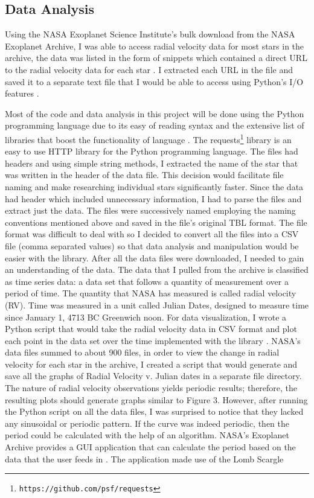 \documentclass[12pt]{article}
\begin{document}
\subsection{Data Analysis}
Using the NASA Exoplanet Science Institute’s bulk download from the NASA Exoplanet Archive, I was able to access radial velocity data for most stars in the archive,  the data was listed in the form of {
\selectfont{wget}} snippets which contained a direct URL to the radial velocity data for each star \cite{akeson2013nasa}. I extracted each URL in the file and saved it to a separate text file that I would be able to access using Python’s I/O features \cite{python}.
\par
Most of the code and data analysis in this project will be done using the Python programming language due to its easy of reading syntax and the extensive list of libraries that boost the functionality of language \cite{python}. The requests\footnote{\texttt{https://github.com/psf/requests}} library is an easy to use HTTP library for the Python programming language. The files had headers and using simple string methods, I extracted the name of the star that was written in the header of the data file. This decision would facilitate file naming and make researching individual stars significantly faster. Since the data had header which included unnecessary information, I had to parse the files and extract just the data. The files were successively named employing the naming conventions mentioned above and saved in the file’s original TBL format. The file format was difficult to deal with so I decided to convert all the files into a CSV file (comma separated values) so that data analysis and manipulation would be easier with the {\selectfont{pandas}} library. After all the data files were downloaded, I needed to gain an understanding of the data. The data that I pulled from the archive is classified as time series data: a data set that follows a quantity of measurement over a period of time. The quantity that NASA has measured is called radial velocity (RV). Time was measured in a unit called Julian Dates, designed to measure time since January 1, 4713 BC Greenwich noon.  For data visualization, I wrote a Python script that would take the radial velocity data in CSV format and plot each point in the data set over the time implemented with the {\selectfont{matplotlib}} library \cite{hunter2007matplotlib}. NASA’s data files summed to about 900 files, in order to view the change in radial velocity for each star in the archive, I created a script that would generate and save all the graphs of Radial Velocity v. Julian dates in a separate file directory. The nature of radial velocity observations yields periodic results; therefore, the resulting plots should generate graphs similar to Figure 3. However, after running the Python script on all the data files, I was surprised to notice that they lacked any sinusoidal or periodic pattern. If the curve was indeed periodic, then the period could be calculated with the help of an algorithm. NASA’s Exoplanet Archive provides a GUI application that can calculate the period based on the data that the user feeds in \cite{akeson2013nasa}. The application made use of the Lomb Scargle 
\end{document}
